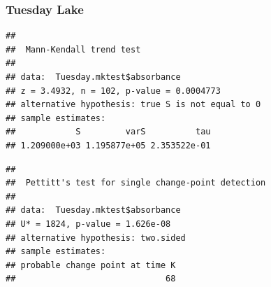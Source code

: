 \documentclass[12pt,]{article}
\newenvironment{Shaded}{\begin{snugshade}}{\end{snugshade}}
\newcommand{\KeywordTok}[1]{\textcolor[rgb]{0.13,0.29,0.53}{\textbf{#1}}}
\newcommand{\DecValTok}[1]{\textcolor[rgb]{0.00,0.00,0.81}{#1}}
\newcommand{\StringTok}[1]{\textcolor[rgb]{0.31,0.60,0.02}{#1}}
\newcommand{\CommentTok}[1]{\textcolor[rgb]{0.56,0.35,0.01}{\textit{#1}}}
\newcommand{\OperatorTok}[1]{\textcolor[rgb]{0.81,0.36,0.00}{\textbf{#1}}}
\newcommand{\NormalTok}[1]{#1}
\begin{document}
\subsubsection{Tuesday Lake}\label{tuesday-lake}

\begin{Shaded}
\end{Shaded}

\begin{verbatim}
## 
##  Mann-Kendall trend test
## 
## data:  Tuesday.mktest$absorbance
## z = 3.4932, n = 102, p-value = 0.0004773
## alternative hypothesis: true S is not equal to 0
## sample estimates:
##            S         varS          tau 
## 1.209000e+03 1.195877e+05 2.353522e-01
\end{verbatim}

\begin{Shaded}
\end{Shaded}

\begin{verbatim}
## 
##  Pettitt's test for single change-point detection
## 
## data:  Tuesday.mktest$absorbance
## U* = 1824, p-value = 1.626e-08
## alternative hypothesis: two.sided
## sample estimates:
## probable change point at time K 
##                              68
\end{verbatim}

\begin{Shaded}
\end{Shaded}
\end{document}
